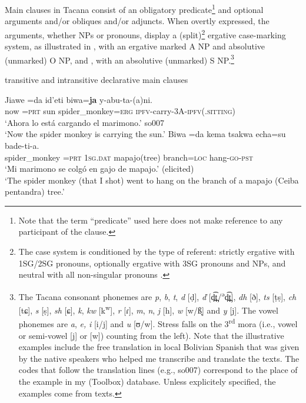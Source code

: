 \documentclass[output=paper]{langsci/langscibook}
\begin{document}
Main clauses in Tacana consist of an obligatory predicate\footnote{Note that the term ``predicate'' used here does not make
    reference to any participant of the clause.} 
and optional arguments and\slash or obliques
and\slash or adjuncts. When overtly expressed, the arguments, whether NPs
or pronouns, display a (split)\footnote{The case system is conditioned by the type of referent:
    strictly ergative with 1SG\slash 2SG pronouns, optionally ergative
    with 3SG pronouns and NPs, and neutral with all non-singular
    pronouns \parencites{Guillaume2016b}{Guillaume-forthcoming}.} 
ergative case-marking system, as illustrated in , with an ergative
marked A NP and absolutive (unmarked) O NP, and
, with an
absolutive (unmarked) S NP.\footnote{\label{fn:tacana-phonemes}The Tacana consonant phonemes are
\textit{p}, \textit{b}, \textit{t}, \textit{d} [ḍ], \textit{ď}
[d̪͡t̪/\textsuperscript{ə}d̪͡t̪], \textit{dh}
[ð], \textit{ts} [ṭṣ], \textit{ch} [tɕ],
\textit{s} [ṣ], \textit{sh} [ɕ], \textit{k}, \textit{kw}
[k\textsuperscript{w}], \textit{r} [ɾ], \textit{m}, \textit{n},
\textit{j} [h], \textit{w} [w/ß̞] and \textit{y} [j]. The vowel
phonemes are \textit{a}, \textit{e,} \textit{i} [i/j] and \textit{u}
[ʊ/w]. Stress falls on the 3\textsuperscript{rd} mora (i.e., vowel
or semi-vowel [j] or [w]) counting from the left). Note that the
illustrative examples include the free translation in local Bolivian
Spanish that was given by the native speakers who helped me transcribe and
translate the texts. The codes that follow the translation lines (e.g.,
so007) correspond to the place of the example in my (Toolbox) database.
Unless explicitely specified, the examples come from texts.}

\begin{exe}\ex\label{ex:tacana-monkey-sun-branch} transitive and intransitive declarative main clauses
    \begin{xlist}
    \ex\label{ex:tacana-monkey-sun}
    \gll Jiawe	=da	id'eti	biwa=\textbf{ja}	y-abu-ta-(a)ni.\\
    now	=\textsc{prt}	sun	spider\_monkey=\textsc{erg}	\textsc{ipfv}-carry-3A-\textsc{ipfv(.sitting)}\\
    \glt `Ahora lo está cargando el marimono.' so007\\
    `Now the spider monkey is carrying the sun.’ 
    \ex\label{ex:tacana-monkey-branch}
    \gll {}Biwa	=da	kema	{\ob}tsakwa	echa=su{\cb}	bade-ti-a.\\
    spider\_monkey	=\textsc{prt}	\textsc{1sg.dat}	mapajo(tree)	branch=\textsc{loc}	hang-\textsc{go}-\textsc{pst}\\
    \glt ‘Mi marimono se colgó en gajo de mapajo.’ (elicited)\\
    ‘The spider monkey (that I shot) went to hang on the branch of a mapajo (Ceiba pentandra) tree.’
    \end{xlist}\end{exe}
\end{document}
